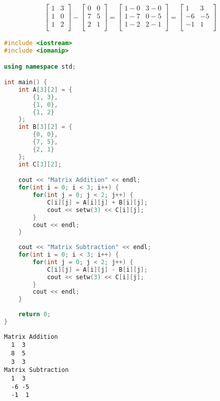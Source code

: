 \begin{align}\nonumber
	\left[\begin{matrix}
			1 & 3 \\
			1 & 0 \\
			1 & 2 \\
		\end{matrix} \right]
	-
	\left[\begin{matrix}
			0 & 0 \\
			7 & 5 \\
			2 & 1 \\
		\end{matrix} \right]
	=
	\left[\begin{matrix}
			1-0 & 3-0 \\
			1-7 & 0-5 \\
			1-2 & 2-1 \\
		\end{matrix} \right]
	=
	\left[\begin{matrix}
			1  & 3  \\
			-6 & -5 \\
			-1 & 1  \\
		\end{matrix} \right]
\end{align}

\begin{lstlisting}[language=C++]
#include <iostream>
#include <iomanip>

using namespace std;

int main() {
	int A[3][2] = {
		{1, 3},
		{1, 0},
		{1, 2}
	};
	int B[3][2] = {
		{0, 0},
		{7, 5},
		{2, 1}
	};
	int C[3][2];

	cout << "Matrix Addition" << endl;
	for(int i = 0; i < 3; i++) {
		for(int j = 0; j < 2; j++) {
			C[i][j] = A[i][j] + B[i][j];
			cout << setw(3) << C[i][j];
		}
		cout << endl;
	}
	
	cout << "Matrix Subtraction" << endl;
	for(int i = 0; i < 3; i++) {
		for(int j = 0; j < 2; j++) {
			C[i][j] = A[i][j] - B[i][j];
			cout << setw(3) << C[i][j];
		}
		cout << endl;
	}
	
	return 0;
}
\end{lstlisting}

\begin{tcolorbox}
	\begin{verbatim}
Matrix Addition
  1  3
  8  5
  3  3
Matrix Subtraction
  1  3
  -6 -5
  -1  1
	\end{verbatim}
\end{tcolorbox}

